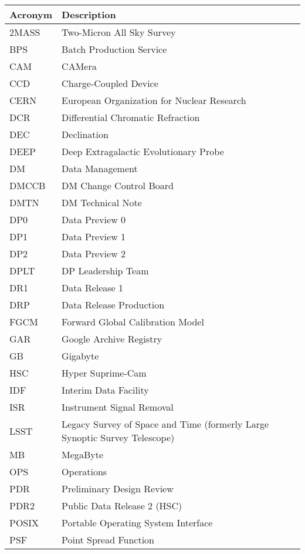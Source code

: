 \addtocounter{table}{-1}
\begin{longtable}{p{}p{}}\hline
\textbf{Acronym} & \textbf{Description}  \\\hline

2MASS & Two-Micron All Sky Survey \\\hline
BPS & Batch Production Service \\\hline
CAM & CAMera \\\hline
CCD & Charge-Coupled Device \\\hline
CERN & European Organization for Nuclear Research \\\hline
DCR & Differential Chromatic Refraction \\\hline
DEC & Declination \\\hline
DEEP & Deep Extragalactic Evolutionary Probe \\\hline
DM & Data Management \\\hline
DMCCB & DM Change Control Board \\\hline
DMTN & DM Technical Note \\\hline
DP0 & Data Preview 0 \\\hline
DP1 & Data Preview 1 \\\hline
DP2 & Data Preview 2 \\\hline
DPLT & DP Leadership Team \\\hline
DR1 & Data Release 1 \\\hline
DRP & Data Release Production \\\hline
FGCM & Forward Global Calibration Model \\\hline
GAR & Google Archive Registry \\\hline
GB & Gigabyte \\\hline
HSC & Hyper Suprime-Cam \\\hline
IDF & Interim Data Facility \\\hline
ISR & Instrument Signal Removal \\\hline
LSST & Legacy Survey of Space and Time (formerly Large Synoptic Survey Telescope) \\\hline
MB & MegaByte \\\hline
OPS & Operations \\\hline
PDR & Preliminary Design Review \\\hline
PDR2 & Public Data Release 2 (HSC) \\\hline
POSIX & Portable Operating System Interface \\\hline
PSF & Point Spread Function \\\hline

\end{longtable}
